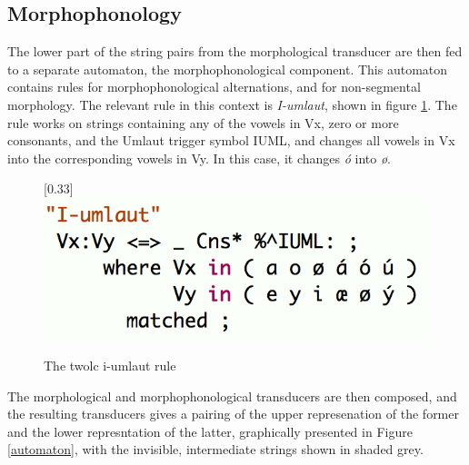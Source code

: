 \documentclass[11pt]{article}
\begin{document}
\subsection{Morphophonology}

The lower part of the string pairs from the morphological transducer are then fed to a separate automaton, the morphophonological component. This automaton contains rules for morphophonological alternations, and for non-segmental morphology. The relevant rule in this context is \textit{I-umlaut}, shown in figure \ref{twoliumlaut}. The rule works on strings containing any of the vowels in Vx, zero or more consonants, and the Umlaut trigger symbol IUML, and changes all vowels in Vx into the corresponding vowels in Vy. In this case, it changes \textit{ó} into \textit{ø}.
 
\begin{figure}[htbp]
\begin{center}
\scalebox{0.33}[0.33]{\includegraphics{img/twoliumlaut.png}}
\caption{The twolc i-umlaut rule}
\label{twoliumlaut}
\end{center}
\end{figure}

The morphological and morphophonological transducers are then composed, and the resulting transducers gives a pairing of the upper represenation of the former and the lower represntation of the latter, graphically presented in Figure \ref{automaton}, with the invisible, intermediate strings shown in shaded grey.
\end{document}
